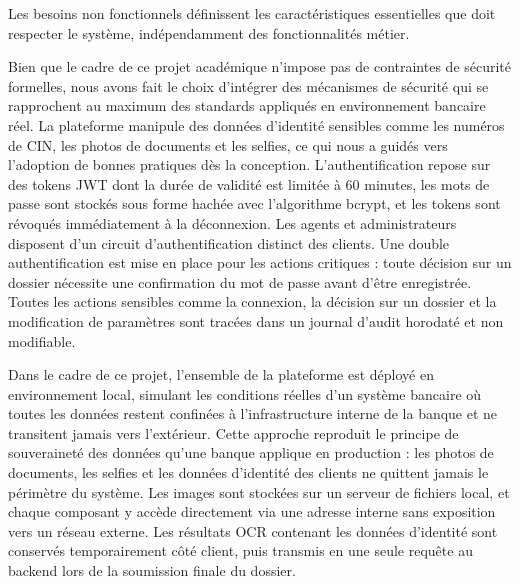 Les besoins non fonctionnels définissent les caractéristiques essentielles que doit respecter le système, indépendamment des fonctionnalités métier.

\begin{description}[style=nextline, leftmargin=0pt, labelwidth=!, font=\bfseries\color{black}]

  \item[Sécurité]
  Bien que le cadre de ce projet académique n'impose pas de contraintes de sécurité formelles, nous avons fait le choix d'intégrer des mécanismes de sécurité qui se rapprochent au maximum des standards appliqués en environnement bancaire réel. La plateforme manipule des données d'identité sensibles comme les numéros de CIN, les photos de documents et les selfies, ce qui nous a guidés vers l'adoption de bonnes pratiques dès la conception. L'authentification repose sur des tokens JWT dont la durée de validité est limitée à 60 minutes, les mots de passe sont stockés sous forme hachée avec l'algorithme bcrypt, et les tokens sont révoqués immédiatement à la déconnexion. Les agents et administrateurs disposent d'un circuit d'authentification distinct des clients. Une double authentification est mise en place pour les actions critiques : toute décision sur un dossier nécessite une confirmation du mot de passe avant d'être enregistrée. Toutes les actions sensibles comme la connexion, la décision sur un dossier et la modification de paramètres sont tracées dans un journal d'audit horodaté et non modifiable.
  \item[Confidentialité des données]
  Dans le cadre de ce projet, l'ensemble de la plateforme est déployé en environnement local, simulant les conditions réelles d'un système bancaire où toutes les données restent confinées à l'infrastructure interne de la banque et ne transitent jamais vers l'extérieur. Cette approche reproduit le principe de souveraineté des données qu'une banque applique en production : les photos de documents, les selfies et les données d'identité des clients ne quittent jamais le périmètre du système. Les images sont stockées sur un serveur de fichiers local, et chaque composant y accède directement via une adresse interne sans exposition vers un réseau externe. Les résultats OCR contenant les données d'identité sont conservés temporairement côté client, puis transmis en une seule requête au backend lors de la soumission finale du dossier.
  \item[Conformité réglementaire]

\end{description}
